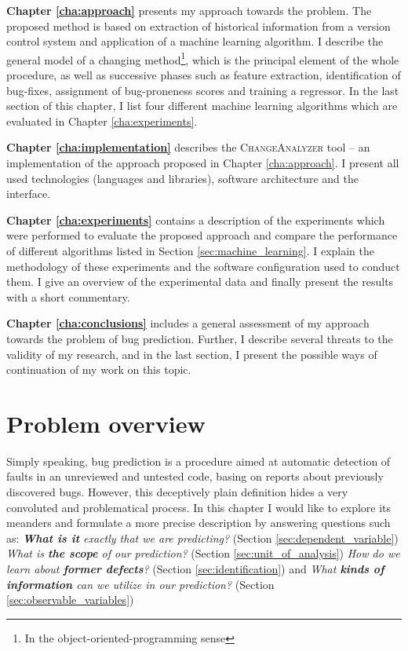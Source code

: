 \documentclass{pracamgr}
\newcommand{\bpar}[1]{\medskip\noindent\textbf{#1}}
\newcommand{\ca}{\textsc{ChangeAnalyzer}\xspace}
\begin{document}
\bpar{Chapter \ref{cha:approach}} presents my approach towards the problem. The proposed method is based on extraction of historical information from a version control system and application of a machine learning algorithm. I describe the general model of a changing method\footnote{In the object-oriented-programming sense}, which is the principal element of the whole procedure, as well as successive phases such as feature extraction, identification of bug-fixes, assignment of bug-proneness scores and training a regressor. In the last section of this chapter, I list four different machine learning algorithms which are evaluated in Chapter \ref{cha:experiments}.

\bpar{Chapter \ref{cha:implementation}} describes the \ca tool -- an implementation of the approach proposed in Chapter \ref{cha:approach}. I present all used technologies (languages and libraries), software architecture and the interface.

\bpar{Chapter \ref{cha:experiments}} contains a description of the experiments which were performed to evaluate the proposed approach and compare the performance of different algorithms listed in Section \ref{sec:machine_learning}. I explain the methodology of these experiments and the software configuration used to conduct them. I give an overview of the experimental data and finally present the results with a short commentary.

\bpar{Chapter \ref{cha:conclusions}} includes a general assessment of my approach towards the problem of bug prediction. Further, I describe several threats to the validity of my research, and in the last section, I present the possible ways of continuation of my work on this topic.

\chapter{Problem overview}
\label{cha:overview}
Simply speaking, bug prediction is a procedure aimed at automatic detection of faults in an unreviewed and untested code, basing on reports about previously discovered bugs. However, this deceptively plain definition hides a very convoluted and problematical process. In this chapter I would like to explore its meanders and formulate a more precise description by answering questions such as: \emph{\textbf{What is it} exactly that we are predicting?} (Section \ref{sec:dependent_variable}) \emph{What is \textbf{the scope} of our prediction?} (Section \ref{sec:unit_of_analysis}) \emph{How do we learn about \textbf{former defects}?} (Section \ref{sec:identification}) and \emph{What \textbf{kinds of information} can we utilize in our prediction?} (Section \ref{sec:observable_variables})
\end{document}
